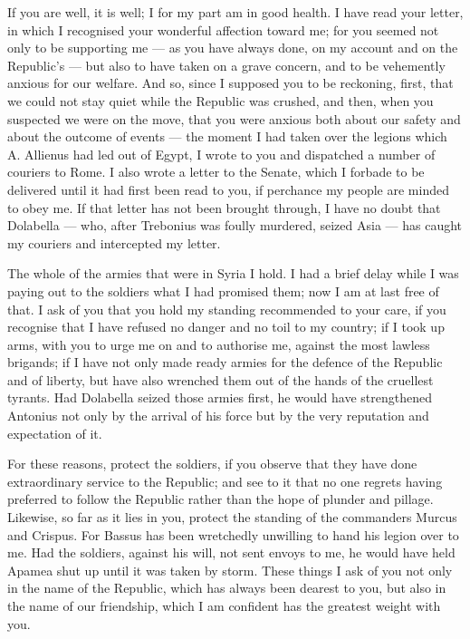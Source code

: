 

 If you are well, it is well; I for my part am in good health. I have read your letter, in which I recognised your wonderful affection toward me; for you seemed not only to be supporting me --- as you have always done, on my account and on the Republic's --- but also to have taken on a grave concern, and to be vehemently anxious for our welfare. And so, since I supposed you to be reckoning, first, that we could not stay quiet while the Republic was crushed, and then, when you suspected we were on the move, that you were anxious both about our safety and about the outcome of events --- the moment I had taken over the legions which A. Allienus had led out of Egypt, I wrote to you and dispatched a number of couriers to Rome. I also wrote a letter to the Senate, which I forbade to be delivered until it had first been read to you, if perchance my people are minded to obey me. If that letter has not been brought through, I have no doubt that Dolabella --- who, after Trebonius was foully murdered, seized Asia --- has caught my couriers and intercepted my letter.

 The whole of the armies that were in Syria I hold. I had a brief delay while I was paying out to the soldiers what I had promised them; now I am at last free of that. I ask of you that you hold my standing recommended to your care, if you recognise that I have refused no danger and no toil to my country; if I took up arms, with you to urge me on and to authorise me, against the most lawless brigands; if I have not only made ready armies for the defence of the Republic and of liberty, but have also wrenched them out of the hands of the cruellest tyrants. Had Dolabella seized those armies first, he would have strengthened Antonius not only by the arrival of his force but by the very reputation and expectation of it.

 For these reasons, protect the soldiers, if you observe that they have done extraordinary service to the Republic; and see to it that no one regrets having preferred to follow the Republic rather than the hope of plunder and pillage. Likewise, so far as it lies in you, protect the standing of the commanders Murcus and Crispus. For Bassus has been wretchedly unwilling to hand his legion over to me. Had the soldiers, against his will, not sent envoys to me, he would have held Apamea shut up until it was taken by storm. These things I ask of you not only in the name of the Republic, which has always been dearest to you, but also in the name of our friendship, which I am confident has the greatest weight with you.

